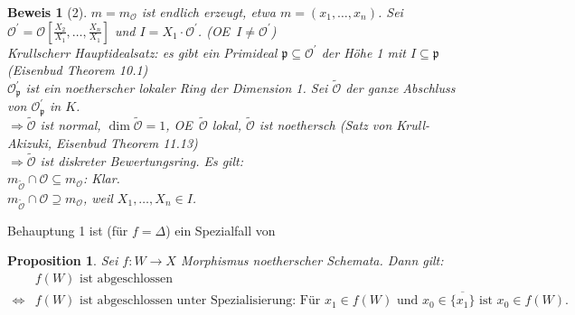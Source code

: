 \documentclass[a4paper,oneside]{scrbook}
\theoremstyle{break}
\newtheorem{Prop}[Def]{Proposition}
\theoremstyle{nonumberbreak}
\theoremstyle{nonumberplain}
\newtheorem{Bew}{Beweis}
\theoremstyle{break}
\renewcommand{\OE}{O\!\!E~}
\begin{document}
\begin{Bew}[2]
  $m=m_{\mathcal O}$ ist endlich erzeugt, etwa $m=(x_1,\dots,x_n)$. Sei $\mathcal O^\prime=\mathcal O[\frac{X_2}{X_1},\dots,\frac{X_n}{X_1}]$
  und $I=X_1\cdot\mathcal O^\prime$. (\OE $I\neq\mathcal O^\prime$) \\
  Krullscherr Hauptidealsatz: es gibt ein Primideal $\mathfrak p\subseteq\mathcal O^\prime$ der Höhe 1 mit $I\subseteq\mathfrak p$
  (Eisenbud Theorem 10.1) \\
  $\mathcal O^\prime_{\mathfrak p}$ ist ein noetherscher lokaler Ring der Dimension 1. Sei $\tilde{\mathcal O}$ der ganze Abschluss von
  $\mathcal O^\prime_{\mathfrak p}$ in $K$. \\
  $\Rightarrow\tilde{\mathcal O}$ ist normal, $\dim\tilde{\mathcal O}=1$, \OE$\tilde{\mathcal O}$ lokal, $\tilde{\mathcal O}$ ist noethersch
  (Satz von Krull-Akizuki, Eisenbud Theorem 11.13) \\
  $\Rightarrow\tilde{\mathcal O}$ ist diskreter Bewertungsring. Es gilt: \\
  $m_{\tilde{\mathcal O}}\cap\mathcal O\subseteq m_{\mathcal O}$: Klar. \\
  $m_{\tilde{\mathcal O}}\cap\mathcal O\supseteq m_{\mathcal O}$, weil $X_1,\dots,X_n\in I$.
\end{Bew}
Behauptung 1 ist (für $f=\Delta$) ein Spezialfall von 
\begin{Prop}
  \label{prop:7.5}
  Sei $f:W\to X$ Morphismus noetherscher Schemata. Dann gilt: 
  \begin{align*}
     & f(W) \text{ ist abgeschlossen }  \\
     \Leftrightarrow & f(W) \text{ ist abgeschlossen unter Spezialisierung: Für } x_1\in f(W)\text{ und } x_0\in\overline{\{x_1\}}\text{ ist } x_0\in f(W).
  \end{align*}
\end{Prop}
\end{document}
